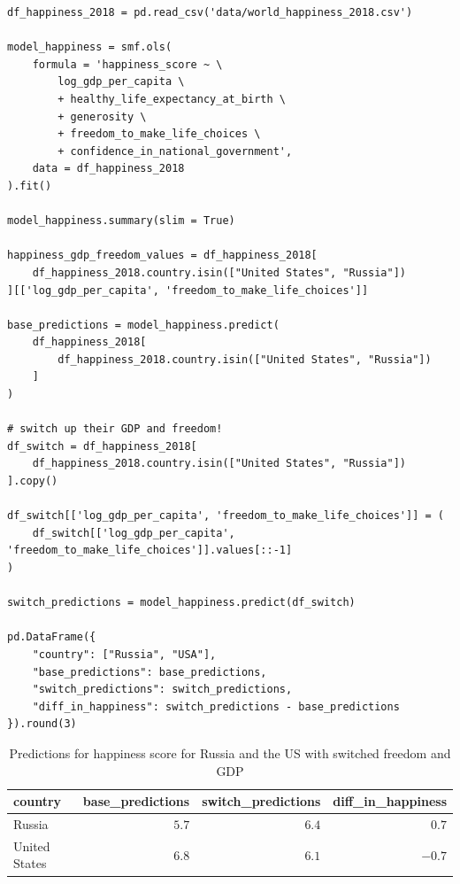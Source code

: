 \documentclass[
  letterpaper,
]{krantz}
\begin{document}
\begin{verbatim}
df_happiness_2018 = pd.read_csv('data/world_happiness_2018.csv')

model_happiness = smf.ols(
    formula = 'happiness_score ~ \
        log_gdp_per_capita \
        + healthy_life_expectancy_at_birth \
        + generosity \
        + freedom_to_make_life_choices \
        + confidence_in_national_government',
    data = df_happiness_2018
).fit()

model_happiness.summary(slim = True)

happiness_gdp_freedom_values = df_happiness_2018[
    df_happiness_2018.country.isin(["United States", "Russia"])
][['log_gdp_per_capita', 'freedom_to_make_life_choices']]

base_predictions = model_happiness.predict(
    df_happiness_2018[
        df_happiness_2018.country.isin(["United States", "Russia"])
    ]
)

# switch up their GDP and freedom!
df_switch = df_happiness_2018[
    df_happiness_2018.country.isin(["United States", "Russia"])
].copy()

df_switch[['log_gdp_per_capita', 'freedom_to_make_life_choices']] = (
    df_switch[['log_gdp_per_capita', 'freedom_to_make_life_choices']].values[::-1]
)    

switch_predictions = model_happiness.predict(df_switch)

pd.DataFrame({
    "country": ["Russia", "USA"],
    "base_predictions": base_predictions,
    "switch_predictions": switch_predictions,
    "diff_in_happiness": switch_predictions - base_predictions
}).round(3)
\end{verbatim}

\begin{longtable}{lrrr}

\caption{\label{tbl-counterfactual-happiness}Predictions for happiness
score for Russia and the US with switched freedom and GDP}

\tabularnewline

\toprule
country & base\_predictions & switch\_predictions & diff\_in\_happiness \\ 
\midrule\addlinespace[2.5pt]
Russia & \textcolor[HTML]{404040}{$5.7$} & \textcolor[HTML]{404040}{$6.4$} & \textcolor[HTML]{404040}{$0.7$} \\ 
United States & \textcolor[HTML]{404040}{$6.8$} & \textcolor[HTML]{404040}{$6.1$} & \textcolor[HTML]{404040}{$-0.7$} \\ 
\bottomrule

\end{longtable}
\end{document}
